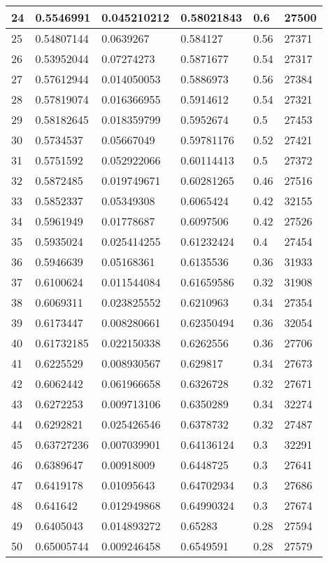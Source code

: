 \begin{longtable}{|l|l|l|l|l|l|}
24 & 0.5546991 & 0.045210212 & 0.58021843 & 0.6 & 27500 \\ \hline 
25 & 0.54807144 & 0.0639267 & 0.584127 & 0.56 & 27371 \\ \hline 
26 & 0.53952044 & 0.07274273 & 0.5871677 & 0.54 & 27317 \\ \hline 
27 & 0.57612944 & 0.014050053 & 0.5886973 & 0.56 & 27384 \\ \hline 
28 & 0.57819074 & 0.016366955 & 0.5914612 & 0.54 & 27321 \\ \hline 
29 & 0.58182645 & 0.018359799 & 0.5952674 & 0.5 & 27453 \\ \hline 
30 & 0.5734537 & 0.05667049 & 0.59781176 & 0.52 & 27421 \\ \hline 
31 & 0.5751592 & 0.052922066 & 0.60114413 & 0.5 & 27372 \\ \hline 
32 & 0.5872485 & 0.019749671 & 0.60281265 & 0.46 & 27516 \\ \hline 
33 & 0.5852337 & 0.05349308 & 0.6065424 & 0.42 & 32155 \\ \hline 
34 & 0.5961949 & 0.01778687 & 0.6097506 & 0.42 & 27526 \\ \hline 
35 & 0.5935024 & 0.025414255 & 0.61232424 & 0.4 & 27454 \\ \hline 
36 & 0.5946639 & 0.05168361 & 0.6135536 & 0.36 & 31933 \\ \hline 
37 & 0.6100624 & 0.011544084 & 0.61659586 & 0.32 & 31908 \\ \hline 
38 & 0.6069311 & 0.023825552 & 0.6210963 & 0.34 & 27354 \\ \hline 
39 & 0.6173447 & 0.008280661 & 0.62350494 & 0.36 & 32054 \\ \hline 
40 & 0.61732185 & 0.022150338 & 0.6262556 & 0.36 & 27706 \\ \hline 
41 & 0.6225529 & 0.008930567 & 0.629817 & 0.34 & 27673 \\ \hline 
42 & 0.6062442 & 0.061966658 & 0.6326728 & 0.32 & 27671 \\ \hline 
43 & 0.6272253 & 0.009713106 & 0.6350289 & 0.34 & 32274 \\ \hline 
44 & 0.6292821 & 0.025426546 & 0.6378732 & 0.32 & 27487 \\ \hline 
45 & 0.63727236 & 0.007039901 & 0.64136124 & 0.3 & 32291 \\ \hline 
46 & 0.6389647 & 0.00918009 & 0.6448725 & 0.3 & 27641 \\ \hline 
47 & 0.6419178 & 0.01095643 & 0.64702934 & 0.3 & 27686 \\ \hline 
48 & 0.641642 & 0.012949868 & 0.64990324 & 0.3 & 27674 \\ \hline 
49 & 0.6405043 & 0.014893272 & 0.65283 & 0.28 & 27594 \\ \hline 
50 & 0.65005744 & 0.009246458 & 0.6549591 & 0.28 & 27579 \\ \hline 
\end{longtable}
